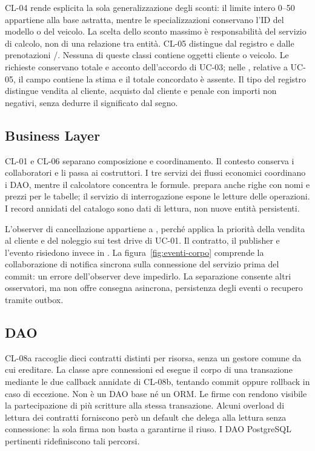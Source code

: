 \clearpage

CL-04 rende esplicita la sola generalizzazione degli sconti: il limite
intero 0--50 appartiene alla base astratta, mentre le specializzazioni
conservano l'ID del modello o del veicolo. La scelta dello sconto massimo
è responsabilità del servizio di calcolo, non di una relazione tra entità.
CL-05 distingue  dal registro  e dalle prenotazioni
/. Nessuna di queste classi contiene oggetti
cliente o veicolo. Le richieste  conservano totale e acconto
dell'accordo di UC-03; nelle , relative a UC-05, il campo
 contiene la stima e il totale concordato è assente.
Il tipo del registro distingue vendita al cliente, acquisto dal cliente e penale con importi
non negativi, senza dedurre il significato dal segno.

\subsection{Business Layer}
CL-01 e CL-06 separano composizione e coordinamento. Il contesto conserva
i collaboratori e li passa ai costruttori. I tre servizi dei flussi
economici coordinano i DAO, mentre il calcolatore concentra le formule.
 prepara anche righe con nomi e prezzi per le tabelle;
il servizio di interrogazione espone le letture delle operazioni.
I record annidati del catalogo sono dati di lettura, non nuove entità persistenti.

L'observer di cancellazione appartiene a , perché applica
la priorità della vendita al cliente e del noleggio sui test drive di UC-01.
Il contratto, il publisher e l'evento risiedono invece in .
La figura~\ref{fig:eventi-corpo} comprende la collaborazione di notifica sincrona sulla connessione
del servizio prima del commit: un errore dell'observer deve impedirlo.
La separazione consente altri osservatori, ma non offre consegna asincrona,
persistenza degli eventi o recupero tramite outbox.

\clearpage

\subsection{DAO}
CL-08a raccoglie dieci contratti distinti per risorsa, senza un gestore
comune da cui ereditare. La classe  apre connessioni ed esegue il corpo
di una transazione mediante le due callback annidate di CL-08b, tentando
commit oppure rollback in caso di eccezione. Non è un DAO base né un ORM.
Le firme con  rendono visibile la partecipazione di più
scritture alla stessa transazione. Alcuni overload di lettura dei contratti
forniscono però un default che delega alla lettura senza connessione:
la sola firma non basta a garantirne il riuso. I DAO PostgreSQL pertinenti
ridefiniscono tali percorsi.

